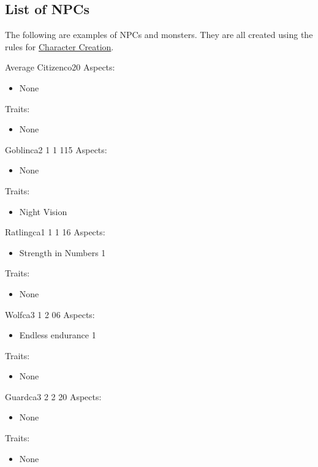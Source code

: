 \documentclass[11pt]{article}
\begin{document}
{\subsection{List of NPCs}
\label{sec:org5319571}
The following are examples of NPCs and monsters. They are all created using the rules for \hyperref[sec:orgd7cd782]{Character Creation}. 

\begin{npc}{Average Citizen}{co}{2}{0}
Aspects:
\begin{itemize}
\item None
\end{itemize}
Traits:
\begin{itemize}
\item None
\end{itemize}
\end{npc}

\begin{npc}{Goblin}{ca}{2 1 1 1}{15}
Aspects:
\begin{itemize}
\item None
\end{itemize}
Traits:
\begin{itemize}
\item Night Vision
\end{itemize}
\end{npc}

\begin{npc}{Ratling}{ca}{1 1 1 1}{6}
Aspects:
\begin{itemize}
\item Strength in Numbers 1
\end{itemize}
Traits:
\begin{itemize}
\item None
\end{itemize}
\end{npc}

\begin{npc}{Wolf}{ca}{3 1 2 0}{6}
Aspects:
\begin{itemize}
\item Endless endurance 1
\end{itemize}
Traits:
\begin{itemize}
\item None
\end{itemize}
\end{npc}

\begin{npc}{Guard}{ca}{3 2 2 2}{0}
Aspects:
\begin{itemize}
\item None
\end{itemize}
Traits:
\begin{itemize}
\item None
\end{itemize}
\end{npc}

}
\end{document}
